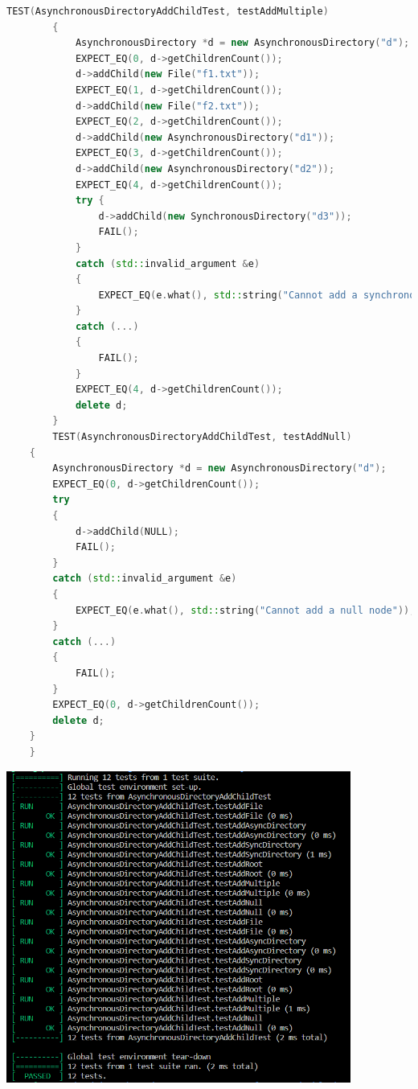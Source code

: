 \documentclass{article}
\begin{document}
\begin{lstlisting}[language=C++]
        TEST(AsynchronousDirectoryAddChildTest, testAddMultiple)
        {
            AsynchronousDirectory *d = new AsynchronousDirectory("d");
            EXPECT_EQ(0, d->getChildrenCount());
            d->addChild(new File("f1.txt"));
            EXPECT_EQ(1, d->getChildrenCount());
            d->addChild(new File("f2.txt"));
            EXPECT_EQ(2, d->getChildrenCount());
            d->addChild(new AsynchronousDirectory("d1"));
            EXPECT_EQ(3, d->getChildrenCount());
            d->addChild(new AsynchronousDirectory("d2"));
            EXPECT_EQ(4, d->getChildrenCount());
            try {
                d->addChild(new SynchronousDirectory("d3"));
                FAIL();
            }
            catch (std::invalid_argument &e)
            {
                EXPECT_EQ(e.what(), std::string("Cannot add a synchronous node to an asynchronous directory"));
            }
            catch (...)
            {
                FAIL();
            }
            EXPECT_EQ(4, d->getChildrenCount());
            delete d;
        }
        TEST(AsynchronousDirectoryAddChildTest, testAddNull)
    {
        AsynchronousDirectory *d = new AsynchronousDirectory("d");
        EXPECT_EQ(0, d->getChildrenCount());
        try
        {
            d->addChild(NULL);
            FAIL();
        }
        catch (std::invalid_argument &e)
        {
            EXPECT_EQ(e.what(), std::string("Cannot add a null node"));
        }
        catch (...)
        {
            FAIL();
        }
        EXPECT_EQ(0, d->getChildrenCount());
        delete d;
    }
    }
\end{lstlisting}
\includegraphics[width=0.85\textwidth]{Task7.png}
\end{document}
